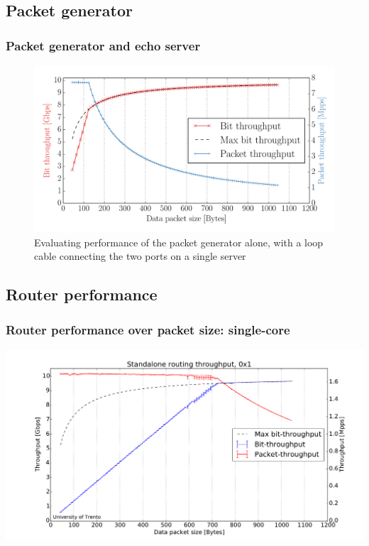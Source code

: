 \subsection{Packet generator}
\begin{frame}[fragile]
  \frametitle{Packet generator and echo server}

  \begin{figure}
    \includegraphics[height=.65\textheight]{img/traffgen_increasing_len.pdf}
    \caption{Evaluating performance of the packet generator alone, with a loop cable connecting the two ports on a single server}
  \end{figure}
\end{frame}


\subsection{Router performance}

\begin{frame}[fragile]
  \frametitle{Router performance over packet size: single-core}
  
  \includegraphics[width=\textwidth]{img/augustus_increasing_len_0x1.pdf}
\end{frame}

